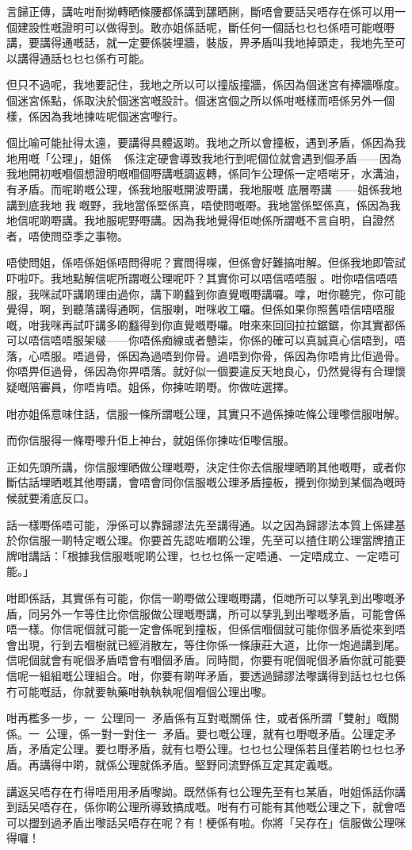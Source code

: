 言歸正傳，講咗咁耐拗轉晒條腰都係講到𦧲晒脷，斷唔會要話㕦唔存在係可以用一個建設性嘅證明可以做得到。敢亦姐係話呢，斷任何一個話乜乜乜係唔可能嘅嘢講，要講得通嘅話，就一定要係裝埋牆，裝版，畀矛盾叫我地掉頭走，我地先至可以講得通話乜乜乜係冇可能。

但只不過呢，我地要記住，我地之所以可以撞版撞牆，係因為個迷宮有捧牆喺度。個迷宮係點，係取決於個迷宮嘅設計。個迷宮個之所以係咁嘅樣而唔係另外一個樣，係因為我地揀咗呢個迷宮嚟行。

個比喻可能扯得太遠，要講得具體返啲。我地之所以會撞板，遇到矛盾，係因為我地用嘅「公理」，姐係，係注定硬會導致我地行到呢個位就會遇到個矛盾——因為我地開初嘅嗰個想證明嘅嗰個嘢講嘅調返轉，係同乍公理係一定唔啱牙，水溝油，有矛盾。而呢啲嘅公理，係我地服嘅開波嘢講，我地服嘅 底層嘢講 ——姐係我地講到底我地󰇞我嘅野，我地當係堅係真，唔使問嘅嘢。我地當係堅係真，係因為我地信呢啲嘢講。我地服呢野嘢講。因為我地覺得佢哋係所謂嘅不言自明，自證然者，唔使問亞季之事物。

唔使問姐，係唔係姐係唔問得呢？實問得㗎，但係會好難搞咁解。但係我地即管試吓啦吓。我地點解信呢所謂嘅公理呢吓？其實你可以唔信唔唔服。咁你唔信唔唔服，我咪試吓講啲理由過你，講下啲蠽到你直覺嘅嘢講囉。嗱，咁你聽完，你可能覺得，啊，到聽落講得通啊，信服喇，咁咪收工囉。但係如果你照舊唔信唔唔服嘅，咁我咪再試吓講多啲蠽得到你直覺嘅嘢囉。咁來來回回拉拉鋸鋸，你其實都係可以唔信唔唔服架啵——你唔係痴線或者戇柒，你係的確可以真誠真心信唔到，唔落，心唔服。唔過骨，係因為過唔到你骨。過唔到你骨，係因為你唔肯比佢過骨。你唔畀佢過骨，係因為你畀唔落。就好似一個要違反天地良心，仍然覺得有合理懷疑嘅陪審員，你唔肯唔。姐係，你揀咗啲嘢。你做咗選擇。

咁亦姐係意味住話，信服一條所謂嘅公理，其實只不過係揀咗條公理嚟信服咁解。

而你信服得一條嘢嚟升佢上神台，就姐係你揀咗佢嚟信服。

正如先頭所講，你信服埋晒做公理嘅嘢，決定住你去信服埋晒啲其他嘅嘢，或者你斷估話埋晒嘅其他嘢講，會唔會同你信服嘅公理矛盾撞板，攪到你拗到某個為嘅時候就要淆底反口。

話一樣嘢係唔可能，淨係可以靠歸謬法先至講得通。以之因為歸謬法本質上係建基於你信服一啲特定嘅公理。你要首先認咗嗰啲公理，先至可以揸住啲公理當牌揸正牌咁講話：「根據我信服嘅呢啲公理，乜乜乜係一定唔通、一定唔成立、一定唔可能。」

咁即係話，其實係有可能，你信一啲嘢做公理嘅嘢講，佢哋所可以孳乳到出嚟嘅矛盾，同另外一乍等住比你信服做公理嘅嘢講，所可以孳乳到出嚟嘅矛盾，可能會係唔一樣。你信呢個就可能一定會係呢到撞板，但係信嗰個就可能你個矛盾從來到唔會出現，行到去嗰樹就已經消散左，等住你係一條康莊大道，比你一炮過講到尾。信呢個就會有呢個矛盾唔會有嗰個矛盾。同時間，你要有呢個呢個矛盾你就可能要信呢一組組嘅公理組合。咁，你要有啲咩矛盾，要透過歸謬法嚟講得到話乜乜乜係冇可能嘅話，你就要執藥咁執執執呢個嗰個公理出嚟。

咁再檻多一步，一󱝚公理同一󱝚矛盾係有互對嘅關係住，或者係所謂「雙射」嘅關係。一󱝚公理，係一對一對住一󱝚矛盾。要乜嘅公理，就有乜嘢嘅矛盾。公理定矛盾，矛盾定公理。要乜嘢矛盾，就有乜嘢公理。乜乜乜公理係若且僅若啲乜乜乜矛盾。再講得中啲，就係公理就係矛盾。堅野同流野係互定其定義嘅。

講返㕦唔存在冇得唔用用矛盾嚟詏。既然係有乜公理先至有乜某盾，咁姐係話你講到話㕦唔存在，係你啲公理所導致搞成嘅。咁有冇可能有其他嘅公理之下，就會唔可以擝到過矛盾出嚟話㕦唔存在呢？有！梗係有啦。你將「㕦存在」信服做公理咪得囉！